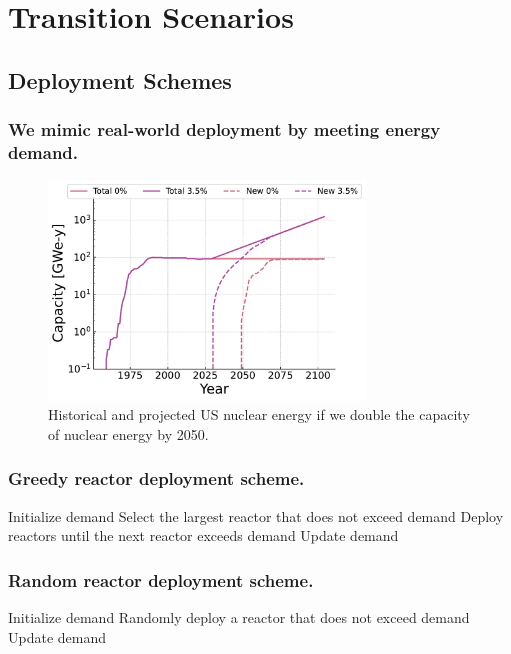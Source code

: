 \documentclass[9pt]{beamer}
\begin{document}
\section{Transition Scenarios}
  \subsection{Deployment Schemes}
  \begin{frame}
    \frametitle{We mimic real-world deployment by meeting energy demand.}
    \begin{figure}
      \centering
      \includegraphics[width=0.75\textwidth]{images/new_capacity_ng_d2.pdf}
      \caption{Historical and projected US nuclear energy if we double the capacity of nuclear energy by 2050.}
    \end{figure}
  \end{frame}

  \begin{frame}
    \frametitle{Greedy reactor deployment scheme.}
      \begin{algorithmic}[1]
          \State Initialize demand
              \State Select the largest reactor that does not exceed demand
              \State Deploy reactors until the next reactor exceeds demand
              \State Update demand
          \EndWhile
      \end{algorithmic}
  \end{frame}

  \begin{frame}
    \frametitle{Random reactor deployment scheme.}
      \begin{algorithmic}[1]
          \State Initialize demand
              \State Randomly deploy a reactor that does not exceed demand
              \State Update demand
          \EndWhile
      \end{algorithmic}
  \end{frame}
\end{document}
